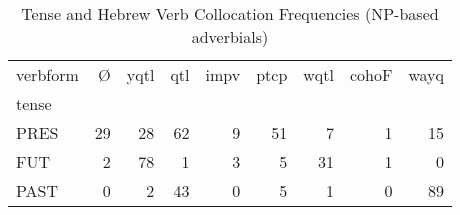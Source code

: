 \begin{table}[htbp!]
\centering
\caption{Tense and Hebrew Verb Collocation Frequencies (NP-based adverbials)}
\label{table:np_tense_ct}
\begin{tabular}{lrrrrrrrr}
\toprule
verbform &   Ø &  yqtl &  qtl &  impv &  ptcp &  wqtl &  cohoF &  wayq \\
tense &     &       &      &       &       &       &        &       \\
\midrule
PRES  &  29 &    28 &   62 &     9 &    51 &     7 &      1 &    15 \\
FUT   &   2 &    78 &    1 &     3 &     5 &    31 &      1 &     0 \\
PAST  &   0 &     2 &   43 &     0 &     5 &     1 &      0 &    89 \\
\bottomrule
\end{tabular}
\end{table}
